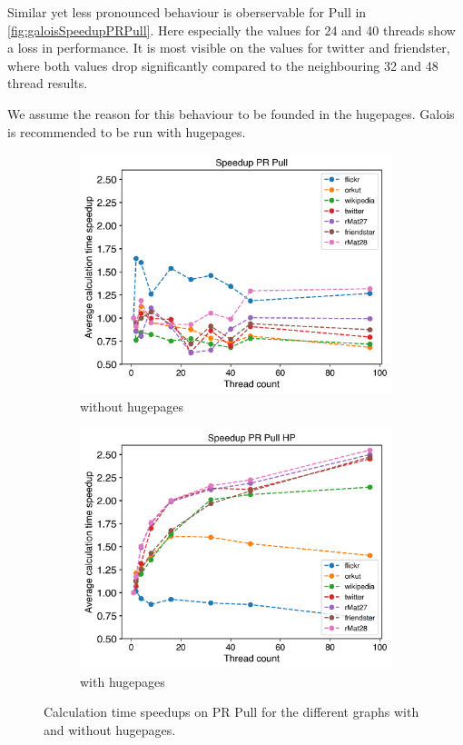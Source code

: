 Similar yet less pronounced behaviour is oberservable for Pull in \autoref{fig:galoisSpeedupPRPull}.
Here especially the values for 24 and 40 threads show a loss in performance.
It is most visible on the values for twitter and friendster, where both values drop significantly compared to the neighbouring 32 and 48 thread results.

We assume the reason for this behaviour to be founded in the hugepages. Galois is recommended to be run with hugepages. 

\begin{figure}
	\hfil
	\begin{subfigure}{0.32\textwidth}
		\includegraphics[width=\linewidth]{../../plots/singleNodePRPullGaloisThreads.png}
		\caption{without hugepages}
		\label{fig:galoisSpeedupPRPull_noHP}
	\end{subfigure}
	\hfil
	\begin{subfigure}{0.32\textwidth}
		\includegraphics[width=\linewidth]{../../plots/singleNodePRPullGaloisHPThreads.png}
		\caption{with hugepages}
		\label{fig:galoisSpeedupPRPull_HP}
	\end{subfigure}
	\hfil
	\caption{Calculation time speedups on PR Pull for the different graphs with and without hugepages.}
	\label{fig:galoisSpeedupPRPull}
\end{figure}
